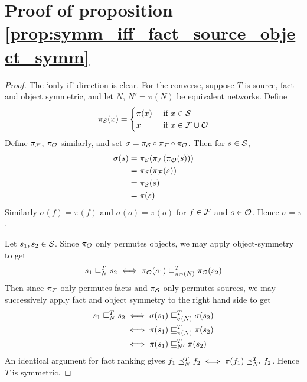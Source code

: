 \documentclass[../main.tex]{subfiles}
\begin{document}
\section{Proof of proposition \ref{prop:symm_iff_fact_source_object_symm}}
\begin{proof}

The `only if' direction is clear. For the converse, suppose $T$ is source, fact
and object symmetric, and let $N$, $N'=\pi(N)$ be equivalent networks. Define
\begin{equation*}
\pi_\S(x) = \begin{cases}
    \pi(x) & \text{ if } x \in \S \\
    x      & \text{ if } x \in \F \cup \O
\end{cases}
\end{equation*}
Define $\pi_\F$, $\pi_\O$ similarly, and set $\sigma = \pi_\S \circ \pi_\F
\circ \pi_\O$. Then for $s \in \S$,
\begin{align*}
\sigma(s) &= \pi_\S(\pi_\F(\pi_\O(s))) \\
          &= \pi_\S(\pi_\F(s)) \\
          &= \pi_\S(s) \\
          &= \pi(s)
\end{align*}
Similarly $\sigma(f)=\pi(f)$ and $\sigma(o)=\pi(o)$ for $f \in \F$ and $o \in
\O$. Hence $\sigma=\pi$.

Let $s_1, s_2 \in \S$. Since $\pi_\O$ only permutes objects, we may apply
object-symmetry to get
$$ s_1 \sle_N^T s_2 \iff \pi_\O(s_1) \sle_{\pi_\O(N)}^T \pi_\O(s_2) $$
Then since $\pi_\F$ only permutes facts and $\pi_\S$ only permutes sources, we
may successively apply fact and object symmetry to the right hand side to get
\begin{align*}
s_1 \sle_N^T s_2 & \iff \sigma(s_1) \sle_{\sigma(N)}^T \sigma(s_2) \\
                 & \iff \pi(s_1) \sle_{\pi(N)}^T \pi(s_2) \\
                 & \iff \pi(s_1) \sle_{N'}^T \pi(s_2)
\end{align*}
An identical argument for fact ranking gives $f_1 \fle_N^T f_2 \iff \pi(f_1)
\fle_{N'}^T f_2$. Hence $T$ is symmetric.

\end{proof}
\end{document}
